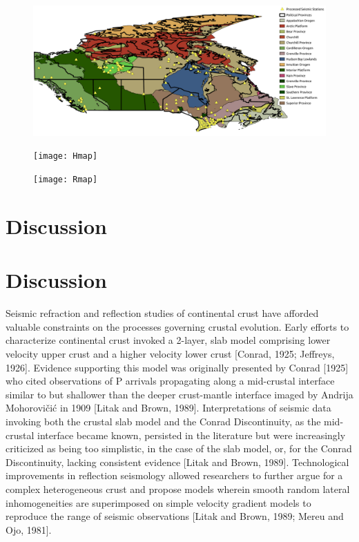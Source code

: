 \documentclass[draft, 12pt]{article}
\begin{document}
\begin{figure}
  \centering
  \includegraphics[width=\textwidth]{stationMap}
  \caption{}
  \label{map:stationMap}
\end{figure}

\begin{figure}
  \centering
  \texttt{[image: Hmap]}
  \caption{}
  \label{map:Hmap}
\end{figure}

\begin{figure}
  \centering
  \texttt{[image: Rmap]}
  \caption{}
  \label{map:Rmap}
\end{figure}



\section{Discussion}

\section{Discussion}

Seismic refraction and reflection studies of continental crust have afforded valuable constraints on the processes governing crustal evolution. Early efforts to characterize continental crust invoked a 2-layer, slab model comprising lower velocity upper crust and a higher velocity lower crust [Conrad, 1925; Jeffreys, 1926]. Evidence supporting this model was originally presented by Conrad [1925] who cited observations of P arrivals propagating along a mid-crustal interface similar to but shallower than the deeper crust-mantle interface imaged by Andrija Mohorovičić in 1909 [Litak and Brown, 1989]. Interpretations of seismic data invoking both the crustal slab model and the Conrad Discontinuity, as the mid-crustal interface became known, persisted in the literature but were increasingly criticized as being too simplistic, in the case of the slab model, or, for the Conrad Discontinuity, lacking consistent evidence [Litak and Brown, 1989]. Technological improvements in reflection seismology allowed researchers to further argue for a complex heterogeneous crust and propose models wherein smooth random lateral inhomogeneities are superimposed on simple velocity gradient models to reproduce the range of seismic observations [Litak and Brown, 1989; Mereu and Ojo, 1981].
\end{document}
